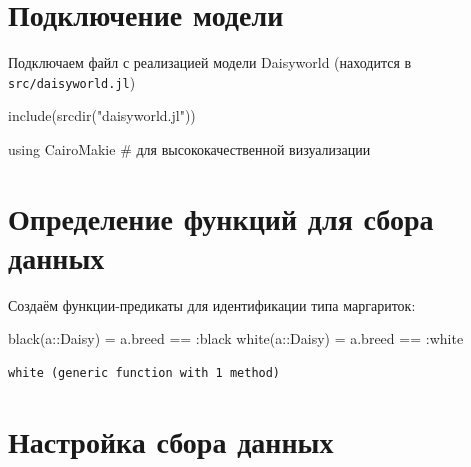 \documentclass[
  12pt,
  a4paper,
  DIV=11,
  numbers=noendperiod]{scrreprt}
\newenvironment{Shaded}{\begin{snugshade}}{\end{snugshade}}
\newcommand{\BuiltInTok}[1]{\textcolor[rgb]{0.00,0.23,0.31}{#1}}
\newcommand{\CommentTok}[1]{\textcolor[rgb]{0.37,0.37,0.37}{#1}}
\newcommand{\DataTypeTok}[1]{\textcolor[rgb]{0.68,0.00,0.00}{#1}}
\newcommand{\FunctionTok}[1]{\textcolor[rgb]{0.28,0.35,0.67}{#1}}
\newcommand{\ImportTok}[1]{\textcolor[rgb]{0.00,0.46,0.62}{#1}}
\newcommand{\NormalTok}[1]{\textcolor[rgb]{0.00,0.23,0.31}{#1}}
\newcommand{\OperatorTok}[1]{\textcolor[rgb]{0.37,0.37,0.37}{#1}}
\newcommand{\StringTok}[1]{\textcolor[rgb]{0.13,0.47,0.30}{#1}}
\begin{document}
\section{Подключение
модели}\label{ux43fux43eux434ux43aux43bux44eux447ux435ux43dux438ux435-ux43cux43eux434ux435ux43bux438-2}

Подключаем файл с реализацией модели Daisyworld (находится в
\texttt{src/daisyworld.jl})

\begin{Shaded}
\begin{Highlighting}[]
\FunctionTok{include}\NormalTok{(}\FunctionTok{srcdir}\NormalTok{(}\StringTok{"daisyworld.jl"}\NormalTok{))}

\ImportTok{using} \BuiltInTok{CairoMakie}  \CommentTok{\# для высококачественной визуализации}
\end{Highlighting}
\end{Shaded}

\section{Определение функций для сбора
данных}\label{ux43eux43fux440ux435ux434ux435ux43bux435ux43dux438ux435-ux444ux443ux43dux43aux446ux438ux439-ux434ux43bux44f-ux441ux431ux43eux440ux430-ux434ux430ux43dux43dux44bux445-1}

Создаём функции-предикаты для идентификации типа маргариток:

\begin{Shaded}
\begin{Highlighting}[]
\FunctionTok{black}\NormalTok{(a}\OperatorTok{::}\DataTypeTok{Daisy}\NormalTok{) }\OperatorTok{=}\NormalTok{ a.breed }\OperatorTok{==} \OperatorTok{:}\NormalTok{black}
\FunctionTok{white}\NormalTok{(a}\OperatorTok{::}\DataTypeTok{Daisy}\NormalTok{) }\OperatorTok{=}\NormalTok{ a.breed }\OperatorTok{==} \OperatorTok{:}\NormalTok{white}
\end{Highlighting}
\end{Shaded}

\begin{verbatim}
white (generic function with 1 method)
\end{verbatim}

\section{Настройка сбора
данных}\label{ux43dux430ux441ux442ux440ux43eux439ux43aux430-ux441ux431ux43eux440ux430-ux434ux430ux43dux43dux44bux445-1}
\end{document}

